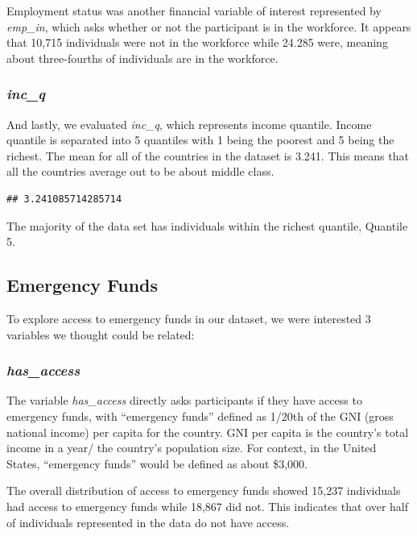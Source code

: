 \documentclass[water,article,submit,moreauthors,pdftex]{mdpi}
\begin{document}
Employment status was another financial variable of interest represented
by \emph{emp\_in}, which asks whether or not the participant is in the
workforce. It appears that 10,715 individuals were not in the workforce
while 24.285 were, meaning about three-fourths of individuals are in the
workforce.

\hypertarget{inc_q}{%
\subsubsection{\texorpdfstring{\emph{inc\_q}}{inc\_q}}\label{inc_q}}

And lastly, we evaluated \emph{inc\_q}, which represents income
quantile. Income quantile is separated into 5 quantiles with 1 being the
poorest and 5 being the richest. The mean for all of the countries in
the dataset is 3.241. This means that all the countries average out to
be about middle class.

\begin{verbatim}
## 3.241085714285714
\end{verbatim}

The majority of the data set has individuals within the richest
quantile, Quantile 5.

\hypertarget{emergency-funds}{%
\subsection{Emergency Funds}\label{emergency-funds}}

To explore access to emergency funds in our dataset, we were interested
3 variables we thought could be related:

\hypertarget{has_access}{%
\subsubsection{\texorpdfstring{\emph{has\_access}}{has\_access}}\label{has_access}}

The variable \emph{has\_access} directly asks participants if they have
access to emergency funds, with ``emergency funds'' defined as 1/20th of
the GNI (gross national income) per capita for the country. GNI per
capita is the country's total income in a year/ the country's population
size. For context, in the United States, ``emergency funds'' would be
defined as about \$3,000.

The overall distribution of access to emergency funds showed 15,237
individuals had access to emergency funds while 18,867 did not. This
indicates that over half of individuals represented in the data do not
have access.
\end{document}

